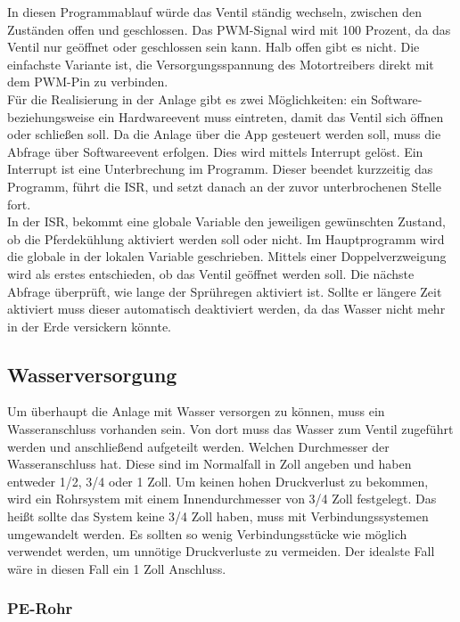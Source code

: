 In diesen Programmablauf würde das Ventil ständig wechseln, zwischen den Zuständen offen und geschlossen. Das PWM-Signal wird mit 100 Prozent, da das Ventil nur geöffnet oder geschlossen sein kann. Halb offen gibt es nicht. Die einfachste Variante ist, die Versorgungsspannung des Motortreibers direkt mit dem PWM-Pin zu verbinden.\\
Für die Realisierung in der Anlage gibt es zwei Möglichkeiten: ein Software- beziehungsweise ein Hardwareevent muss eintreten, damit das Ventil sich öffnen oder schließen soll. Da die Anlage über die App gesteuert werden soll, muss die Abfrage über Softwareevent erfolgen. Dies wird mittels Interrupt gelöst. Ein Interrupt ist eine Unterbrechung im Programm. Dieser beendet kurzzeitig das Programm, führt die \ac{ISR}, und setzt danach an der zuvor unterbrochenen Stelle fort. \\ In der \ac{ISR}, bekommt eine globale Variable den jeweiligen gewünschten Zustand, ob die Pferdekühlung aktiviert werden soll oder nicht. Im Hauptprogramm wird die globale in der lokalen Variable geschrieben. Mittels einer Doppelverzweigung wird als erstes entschieden, ob das Ventil geöffnet werden soll. Die nächste Abfrage überprüft, wie lange der Sprühregen aktiviert ist. Sollte er längere Zeit aktiviert muss dieser automatisch deaktiviert werden, da das Wasser nicht mehr in der Erde versickern könnte.

\subsection{Wasserversorgung}
\label{sec:wasserversorgung}

Um überhaupt die Anlage mit Wasser versorgen zu können, muss ein Wasseranschluss vorhanden sein. Von dort muss das Wasser zum Ventil zugeführt werden und anschließend aufgeteilt werden. Welchen Durchmesser der Wasseranschluss hat. Diese sind im Normalfall in Zoll angeben und haben entweder 1/2, 3/4 oder 1 Zoll. Um keinen hohen Druckverlust zu bekommen, wird ein Rohrsystem mit einem Innendurchmesser von 3/4 Zoll festgelegt. Das heißt sollte das System keine 3/4 Zoll haben, muss mit Verbindungssystemen umgewandelt werden. Es sollten so wenig Verbindungsstücke wie möglich verwendet werden, um unnötige Druckverluste zu vermeiden. Der idealste Fall wäre in diesen Fall ein 1 Zoll Anschluss. \\ 


\subsubsection{PE-Rohr}
\label{sec:peRohr}

